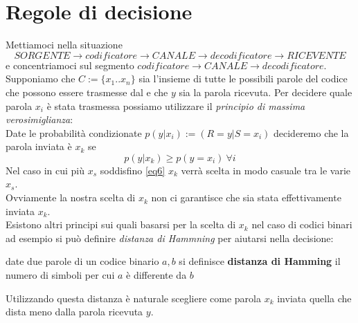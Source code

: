 \section{Regole di decisione}
Mettiamoci nella situazione
$$ SORGENTE \to codificatore \to CANALE \to decodificatore \to RICEVENTE$$
e concentriamoci sul segmento $codificatore \to CANALE \to decodificatore$.\\
Supponiamo che $C:=\{ x_1 ..x_n \}$ sia l'insieme di tutte le possibili parole del codice che possono essere trasmesse dal e che $y$ sia la parola ricevuta. Per decidere quale parola $x_i$ è stata trasmessa possiamo utilizzare il \textit{principio di massima verosimiglianza}:\\
Date le probabilità condizionate $p(y|x_i):=(R=y|S=x_i)$ decideremo che la parola inviata è $x_k$ se
\begin{equation} \label{eq6}
p(y|x_k )\geq p(y=x_i) \ \forall i
\end{equation}
Nel caso in cui più $x_s$ soddisfino \ref{eq6} $x_k$ verrà scelta in modo casuale tra le varie $x_s$.\\
Ovviamente la nostra scelta di $x_k$ non ci garantisce che sia stata effettivamente inviata $x_k$.\\
Esistono altri principi sui quali basarsi per la scelta di $x_k$ nel caso di codici binari ad esempio si può definire \textit{distanza di Hammning} per aiutarsi nella decisione:
\begin{defi}
date due parole di un codice binario $a,b$ si definisce \textbf{distanza di Hamming} il numero di simboli per cui $a$ è differente da $b$
\end{defi}
Utilizzando questa distanza è naturale scegliere come parola $x_k$ inviata quella che dista meno dalla parola ricevuta $y$.

